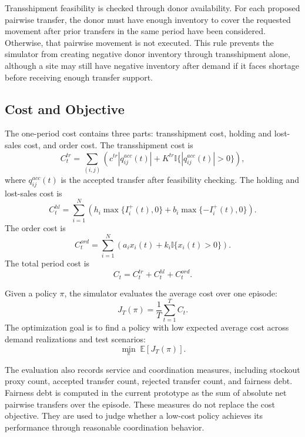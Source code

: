 \documentclass[journal]{IEEEtran}
\begin{document}
Transshipment feasibility is checked through donor availability. For each proposed pairwise transfer, the donor must have enough inventory to cover the requested movement after prior transfers in the same period have been considered. Otherwise, that pairwise movement is not executed. This rule prevents the simulator from creating negative donor inventory through transshipment alone, although a site may still have negative inventory after demand if it faces shortage before receiving enough transfer support.

\subsection{Cost and Objective}

The one-period cost contains three parts: transshipment cost, holding and lost-sales cost, and order cost. The transshipment cost is
\begin{equation}
    C_t^{tr}=\sum_{(i,j)} \left(c^{tr}|q_{ij}^{acc}(t)| + K^{tr}\mathbb{I}\{|q_{ij}^{acc}(t)|>0\}\right),
\end{equation}
where $q_{ij}^{acc}(t)$ is the accepted transfer after feasibility checking. The holding and lost-sales cost is
\begin{equation}
    C_t^{hl}=\sum_{i=1}^{N}\left(h_i\max\{I_i^{+}(t),0\}+b_i\max\{-I_i^{+}(t),0\}\right).
\end{equation}
The order cost is
\begin{equation}
    C_t^{ord}=\sum_{i=1}^{N}\left(a_i x_i(t)+k_i\mathbb{I}\{x_i(t)>0\}\right).
\end{equation}
The total period cost is
\begin{equation}
    C_t=C_t^{tr}+C_t^{hl}+C_t^{ord}.
\end{equation}

Given a policy $\pi$, the simulator evaluates the average cost over one episode:
\begin{equation}
    J_T(\pi)=\frac{1}{T}\sum_{t=1}^{T}C_t.
\end{equation}
The optimization goal is to find a policy with low expected average cost across demand realizations and test scenarios:
\begin{equation}
    \min_{\pi}\;\mathbb{E}\left[J_T(\pi)\right].
\end{equation}

The evaluation also records service and coordination measures, including stockout proxy count, accepted transfer count, rejected transfer count, and fairness debt. Fairness debt is computed in the current prototype as the sum of absolute net pairwise transfers over the episode. These measures do not replace the cost objective. They are used to judge whether a low-cost policy achieves its performance through reasonable coordination behavior.
\end{document}

